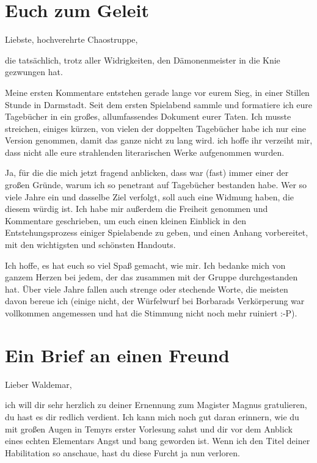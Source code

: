 \chapter{Euch zum Geleit}
Liebste, hochverehrte Chaostruppe, 

die tatsächlich, trotz aller Widrigkeiten, den Dämonenmeister in die Knie gezwungen hat.

Meine ersten Kommentare entstehen gerade lange vor eurem Sieg, in einer Stillen Stunde in Darmstadt. Seit dem ersten Spielabend sammle und formatiere ich eure Tagebücher in ein großes, allumfassendes Dokument eurer Taten. Ich musste streichen, einiges kürzen, von vielen der doppelten Tagebücher habe ich nur eine Version genommen, damit das ganze nicht zu lang wird. ich hoffe ihr verzeiht mir, dass nicht alle eure strahlenden literarischen Werke aufgenommen wurden.

Ja, für die die mich jetzt fragend anblicken, dass war (fast) immer einer der großen Gründe, warum ich so penetrant auf Tagebücher bestanden habe. Wer so viele Jahre ein und dasselbe Ziel verfolgt, soll auch eine Widmung haben, die diesem würdig ist. Ich habe mir außerdem die Freiheit genommen und Kommentare geschrieben, um euch einen kleinen Einblick in den Entstehungsprozess einiger Spielabende zu geben, und einen Anhang vorbereitet, mit den wichtigsten und schönsten Handouts.

Ich hoffe, es hat euch so viel Spaß gemacht, wie mir. Ich bedanke mich von ganzem Herzen bei jedem, der das zusammen mit der Gruppe durchgestanden hat. Über viele Jahre fallen auch strenge oder stechende Worte, die meisten davon bereue ich (einige nicht, der Würfelwurf bei Borbarads Verkörperung war vollkommen angemessen und hat die Stimmung nicht noch mehr ruiniert :-P).



\chapter{Ein Brief an einen Freund}


Lieber Waldemar,

ich will dir sehr herzlich zu deiner Ernennung zum Magister Magnus gratulieren, du hast es dir redlich verdient. Ich kann mich noch gut daran erinnern, wie du mit großen Augen in Temyrs erster Vorlesung sahst und dir vor dem Anblick eines echten Elementars Angst und bang geworden ist. Wenn ich den Titel deiner Habilitation so anschaue, hast du diese Furcht ja nun verloren.


